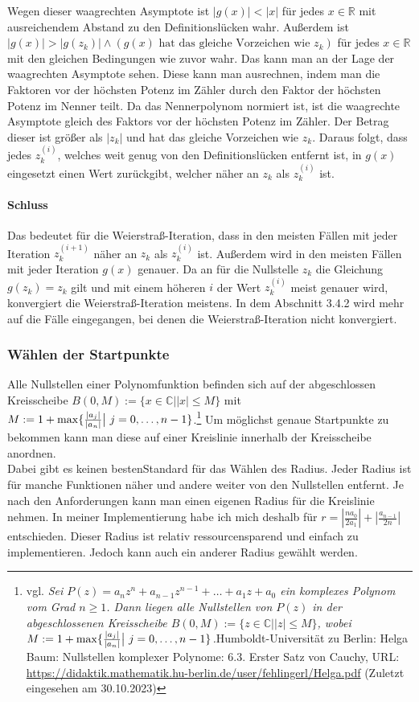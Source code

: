 \documentclass[12pt]{article}
\begin{document}
Wegen dieser waagrechten Asymptote ist $|g(x)|<|x|$ für jedes $x \in \mathbb{R}$ mit ausreichendem Abstand zu den Definitionslücken wahr. Außerdem ist $|g(x)|>|g(z_k)| \land (g(x) \text{ hat das gleiche Vorzeichen wie } z_k)$ für jedes $x \in \mathbb{R}$ mit den gleichen Bedingungen wie zuvor wahr.
Das kann man an der Lage der waagrechten Asymptote sehen. Diese kann man ausrechnen, indem man die Faktoren vor der höchsten Potenz im Zähler durch den Faktor der höchsten Potenz im Nenner teilt. Da das Nennerpolynom normiert ist, ist die waagrechte Asymptote gleich des Faktors vor der höchsten Potenz im Zähler. Der Betrag dieser ist größer als $|z_k|$ und hat das gleiche Vorzeichen wie $z_k$.
Daraus folgt, dass jedes $z_k^{(i)}$, welches weit genug von den Definitionslücken entfernt ist, in $g(x)$ eingesetzt einen Wert zurückgibt, welcher näher an $z_k$ als $z_k^{(i)}$ ist.

\paragraph{Schluss}
Das bedeutet für die Weierstraß-Iteration, dass in den meisten Fällen mit jeder Iteration $z_k^{(i+1)}$ näher an $z_k$ als $z_k^{(i)}$ ist. Außerdem wird in den meisten Fällen mit jeder Iteration $g(x)$ genauer. Da an für die Nullstelle $z_k$ die Gleichung $g(z_k) = z_k$ gilt und mit einem höheren $i$ der Wert $z_k^{(i)}$ meist genauer wird, konvergiert die Weierstraß-Iteration meistens. In dem Abschnitt 3.4.2 wird mehr auf die Fälle eingegangen, bei denen die Weierstraß-Iteration nicht konvergiert.

\subsubsection{Wählen der Startpunkte}
Alle Nullstellen einer Polynomfunktion befinden sich auf der abgeschlossen Kreisscheibe  $B(0,M) := \{x \in \mathbb{C} \bigr| |x| \le M\}$ mit $M := 1 + \max\{\frac{|a_j|}{|a_n|}\bigr|\text{\space}j=0,\dots,n-1\}$.\footnote{vgl. \glqq\textit{Sei $P(z) = a_nz^n+a_{n-1}z^{n-1}+\dots+a_1z+a_0$ ein komplexes Polynom vom Grad $n \ge 1$. Dann liegen alle Nullstellen von $P(z)$ in der abgeschlossenen Kreisscheibe $B(0,M) := \{z \in \mathbb{C} \bigr| |z| \le M\}$, wobei $M := 1 + \max\{\frac{|a_j|}{|a_n|}\bigr|\text{\space}j=0,\dots,n-1\}$.}\grqq\space Humboldt-Universität zu Berlin: Helga Baum: Nullstellen komplexer Polynome: 6.3. Erster Satz von Cauchy, URL: \url{https://didaktik.mathematik.hu-berlin.de/user/fehlingerl/Helga.pdf} (Zuletzt eingesehen am 30.10.2023)}  Um möglichst genaue Startpunkte zu bekommen kann man diese auf einer Kreislinie innerhalb der Kreisscheibe anordnen. \\
Dabei gibt es keinen \glqq besten\grqq\space Standard für das Wählen des Radius. Jeder Radius ist für manche Funktionen näher und andere weiter von den Nullstellen entfernt. Je nach den Anforderungen kann man einen eigenen Radius für die Kreislinie nehmen. In meiner Implementierung habe ich mich deshalb für $r = |\frac{na_0}{2a_1}| + |\frac{a_{n-1}}{2n}|$ entschieden.
Dieser Radius ist relativ ressourcensparend und einfach zu implementieren. Jedoch kann auch ein anderer Radius gewählt werden.
\end{document}
